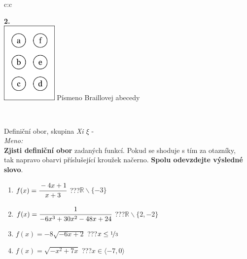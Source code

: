 \documentclass[10pt]{report}
\begin{document}
\begin{tabular}{c:c}
\begin{minipage}[c][99mm][t]{0.49\linewidth}
\begin{center}
\begin{minipage}{0.77\linewidth}
\begin{center}
\begin{varwidth}{\textwidth}
\begin{enumerate}
\end{enumerate}
\end{varwidth}
\end{center}
\end{minipage}
\begin{minipage}{0.20\linewidth}
\begin{center}
{\Huge\bfseries 2.} \\[2mm]
\includegraphics[height=40mm]{../images/braille.png}
{\small Písmeno Braillovej abecedy}
\end{center}
\end{minipage}
\end{center}
\end{minipage}
\\ \hdashline
\begin{minipage}[c][99mm][t]{0.49\linewidth}
\begin{center}
\vspace{7mm}
{\huge Definiční obor, skupina \textit{Xi $\xi$} -}\\[4.5mm]
\textit{Meno:}\phantom{xxxxxxxxxxxxxxxxxxxxxxxxxxxxxxxxxxxxxxxxxxxxxxxxxxxxxxxxxxxxxxxxx}\\[3.5mm]
\textbf{Zjisti definiční obor} zadaných funkcí. Pokud se shoduje s tím za otazníky,\\tak napravo obarvi příslušející kroužek načerno. \textbf{Spolu odevzdejte výsledné slovo}.\\[3mm]
\begin{minipage}{0.77\linewidth}
\begin{center}
\begin{varwidth}{\textwidth}
\begin{enumerate}
\normalsize
\item $f(x)=\cfrac{-4x+1}{x+3}$\quad \dotfill\; ???\;\dotfill \quad $\mathbb{R}\smallsetminus\{-3\}$
\item $f(x)=\cfrac{1}{-6x^3+30x^2-48x+24}$\quad \dotfill\; ???\;\dotfill \quad $\mathbb{R}\smallsetminus\{2,-2\}$
\item $f(x)=-8\sqrt{-6x+2}$\quad \dotfill\; ???\;\dotfill \quad $x\leq\nicefrac{1}{3}$
\item $f(x)=\sqrt{-x^2+7x}$\quad \dotfill\; ???\;\dotfill \quad $x\in\langle-7 , 0\rangle$

\end{enumerate}
\end{varwidth}
\end{center}
\end{minipage}
\end{center}
\end{minipage}
\end{tabular}
\end{document}
